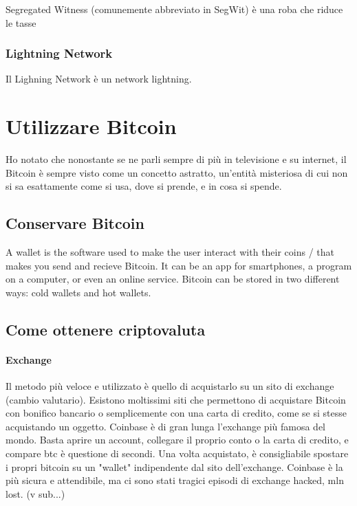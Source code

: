\documentclass {article}
\begin{document}
Segregated Witness (comunemente abbreviato in SegWit) è una roba che riduce le tasse


\subsubsection {Lightning Network}


Il Lighning Network è un network lightning.


\section {Utilizzare Bitcoin}


Ho notato che nonostante se ne parli sempre di più in televisione e su internet, il Bitcoin è sempre visto come un concetto astratto, un'entità misteriosa di cui non si sa esattamente come si usa, dove si prende, e in cosa si spende.


\subsection {Conservare Bitcoin}


A wallet is the software used to make the user interact with their coins / that makes you send and recieve Bitcoin.
It can be an app for smartphones, a program on a computer, or even an online service.
Bitcoin can be stored in two different ways: cold wallets and hot wallets.


\subsection {Come ottenere criptovaluta}


\paragraph {Exchange}


Il metodo più veloce e utilizzato è quello di acquistarlo su un sito di exchange (cambio valutario). Esistono moltissimi siti che permettono di acquistare Bitcoin con bonifico bancario o semplicemente con una carta di credito, come se si stesse acquistando un oggetto.
Coinbase è di gran lunga l'exchange più famosa del mondo.
Basta aprire un account, collegare il proprio conto o la carta di credito, e compare btc è questione di secondi.
Una volta acquistato, è consigliabile spostare i propri bitcoin su un "wallet" indipendente dal sito dell'exchange. Coinbase è la più sicura e attendibile, ma ci sono stati tragici episodi di exchange hacked, mln lost. (v sub...)
\end{document}
